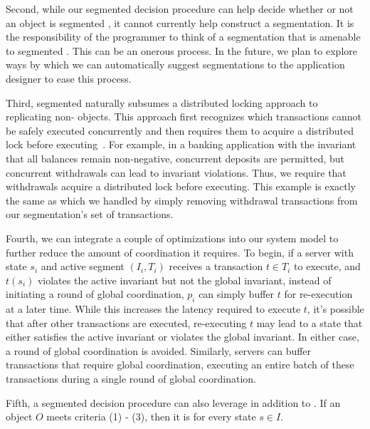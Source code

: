 Second, while our segmented \invariantconfluence{} decision procedure can help
decide whether or not an object is segmented \invariantconfluent{}, it cannot
currently help construct a segmentation. It is the responsibility of the
programmer to think of a segmentation that is amenable to segmented
\invariantconfluence{}. This can be an onerous process. In the future, we
plan to explore ways by which we can automatically suggest segmentations to the
application designer to ease this process.

Third, segmented \invariantconfluence{} naturally subsumes a distributed
locking approach to replicating non-\invariantconfluent{} objects. This
approach first recognizes which transactions cannot be safely executed
concurrently and then requires them to acquire a distributed lock before
executing~\cite{balegas2015putting, gotsman2016cause}. For example, in a
banking application with the invariant that all balances remain non-negative,
concurrent deposits are permitted, but concurrent withdrawals can lead to
invariant violations. Thus, we require that withdrawals acquire a distributed
lock before executing. This example is exactly the same as
 which we handled by simply removing
withdrawal transactions from our segmentation's set of transactions.

Fourth, we can integrate a couple of optimizations into our system model to
further reduce the amount of coordination it requires. To begin, if a server
with state $s_i$ and active segment $(I_i, T_i)$ receives a transaction $t
\in T_i$ to execute, and $t(s_i)$ violates the active invariant but not the
global invariant, instead of initiating a round of global coordination, $p_i$
can simply buffer $t$ for re-execution at a later time. While this increases
the latency required to execute $t$, it's possible that after other
transactions are executed, re-executing $t$ may lead to a state that either
satisfies the active invariant or violates the global invariant. In either
case, a round of global coordination is avoided. 
%
Similarly, servers can buffer transactions that require global coordination,
executing an entire batch of these transactions during a single round of global
coordination.

Fifth, a segmented \invariantconfluence{} decision procedure can also
leverage  in addition to
. If an object $O$ meets
criteria (1) - (3), then it is  for every state $s \in
I$.

